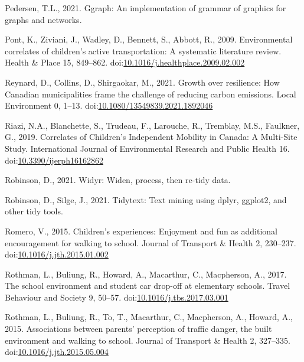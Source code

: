 \documentclass[]{elsarticle} %
\newlength{\cslhangindent}
\newlength{\cslentryspacingunit} %
\newenvironment{CSLReferences}[2] %
 {%
  \setlength{\parindent}{0pt}
  \ifodd #1
  \let\oldpar\par
  \def\par{\hangindent=\cslhangindent\oldpar}
  \fi
  \setlength{\parskip}{#2\cslentryspacingunit}
 }%
 {}
\begin{document}
\begin{CSLReferences}{1}{0}
\leavevmode{}%
Pedersen, T.L., 2021. Ggraph: An implementation of grammar of graphics
for graphs and networks.

\leavevmode{}%
Pont, K., Ziviani, J., Wadley, D., Bennett, S., Abbott, R., 2009.
Environmental correlates of children's active transportation: A
systematic literature review. Health \& Place 15, 849--862.
doi:\href{https://doi.org/10.1016/j.healthplace.2009.02.002}{10.1016/j.healthplace.2009.02.002}

\leavevmode{}%
Reynard, D., Collins, D., Shirgaokar, M., 2021. Growth over resilience:
How {Canadian} municipalities frame the challenge of reducing carbon
emissions. Local Environment 0, 1--13.
doi:\href{https://doi.org/10.1080/13549839.2021.1892046}{10.1080/13549839.2021.1892046}

\leavevmode{}%
Riazi, N.A., Blanchette, S., Trudeau, F., Larouche, R., Tremblay, M.S.,
Faulkner, G., 2019. Correlates of {Children}'s {Independent Mobility} in
{Canada}: A {Multi}-{Site Study}. International Journal of Environmental
Research and Public Health 16.
doi:\href{https://doi.org/10.3390/ijerph16162862}{10.3390/ijerph16162862}

\leavevmode{}%
Robinson, D., 2021. Widyr: Widen, process, then re-tidy data.

\leavevmode{}%
Robinson, D., Silge, J., 2021. Tidytext: Text mining using dplyr,
ggplot2, and other tidy tools.

\leavevmode{}%
Romero, V., 2015. {Children}'s experiences: Enjoyment and fun as
additional encouragement for walking to school. Journal of Transport \&
Health 2, 230--237.
doi:\href{https://doi.org/10.1016/j.jth.2015.01.002}{10.1016/j.jth.2015.01.002}

\leavevmode{}%
Rothman, L., Buliung, R., Howard, A., Macarthur, C., Macpherson, A.,
2017. The school environment and student car drop-off at elementary
schools. Travel Behaviour and Society 9, 50--57.
doi:\href{https://doi.org/10.1016/j.tbs.2017.03.001}{10.1016/j.tbs.2017.03.001}

\leavevmode{}%
Rothman, L., Buliung, R., To, T., Macarthur, C., Macpherson, A., Howard,
A., 2015. Associations between parents' perception of traffic danger,
the built environment and walking to school. Journal of Transport \&
Health 2, 327--335.
doi:\href{https://doi.org/10.1016/j.jth.2015.05.004}{10.1016/j.jth.2015.05.004}


\end{CSLReferences}
\end{document}
